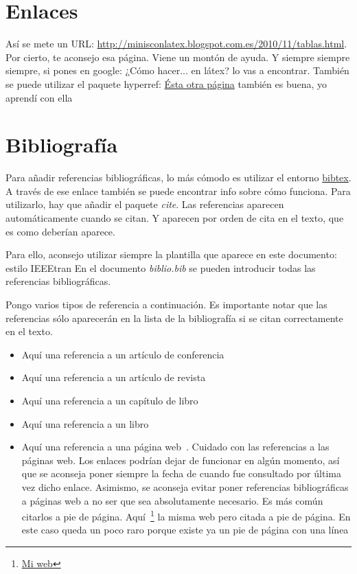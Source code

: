 \documentclass{article}
\begin{document}
\section{Enlaces}
Así se mete un URL: \url{http://minisconlatex.blogspot.com.es/2010/11/tablas.html}. Por cierto, te aconsejo esa página. Viene un montón de ayuda. Y siempre siempre siempre, si pones en google: ¿Cómo hacer... en látex? lo vas a encontrar. También se puede utilizar el paquete hyperref: \href{http://elclubdelautodidacta.es/wp/indice-latex/}{Ésta otra página} también es buena, yo aprendí con ella 


\newpage

\section{Bibliografía}

Para añadir referencias bibliográficas, lo más cómodo es utilizar el entorno \href{https://www.bibtex.org/}{bibtex}. A través de ese enlace también se puede encontrar info sobre cómo funciona. Para utilizarlo, hay que añadir el paquete \textit{cite}. Las referencias aparecen automáticamente cuando se citan. Y aparecen por orden de cita en el texto, que es como deberían aparece.

Para ello, aconsejo utilizar siempre la plantilla que aparece en este documento: estilo IEEEtran 
En el documento \textit{biblio.bib} se pueden introducir todas las referencias bibliográficas.

Pongo varios tipos de referencia a continuación. Es importante notar que las referencias sólo aparecerán en la lista de la bibliografía si se citan correctamente en el texto. 

\begin{itemize}
    \item Aquí una referencia a un artículo de conferencia~\cite{giammarino2023open}
    \item Aquí una referencia a un artículo de revista~\cite{arbaud2024toward}
    \item Aquí una referencia a un capítulo de libro~\cite{pastor2020grasping}
    \item Aquí una referencia a un libro~\cite{featherstone2014rigid}
    \item Aquí una referencia a una página web~\cite{web_juanma}. Cuidado con las referencias a las páginas web. Los enlaces podrían dejar de funcionar en algún momento, así que se aconseja poner siempre la fecha de cuando fue consultado por última vez dicho enlace. Asimismo, se aconseja evitar poner referencias bibliográficas a páginas web a no ser que sea absolutamente necesario. Es más común citarlos a pie de página. Aquí~\footnote{\href{https://jmgandarias.com/}{Mi web}} la misma web pero citada a pie de página. En este caso queda un poco raro porque existe ya un pie de página con una línea
\end{itemize}
\end{document}
